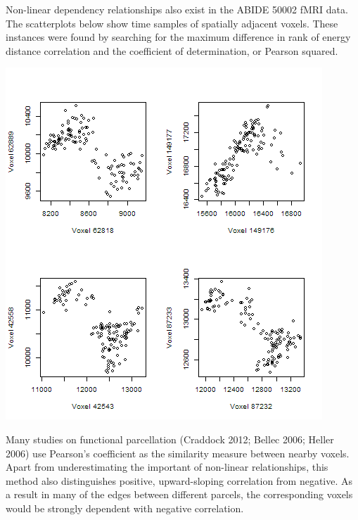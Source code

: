 Non-linear dependency relationships also exist in the ABIDE 50002 fMRI
data. The scatterplots below show time samples of spatially adjacent
voxels. These instances were found by searching for the maximum
difference in rank of energy distance correlation and the coefficient
of determination, or Pearson squared.

\includegraphics[scale = 0.7]{figs/1_nonlinear_ABIDE_50002.png}

Many studies on functional parcellation (Craddock 2012; Bellec 2006;
Heller 2006) use Pearson's coefficient as the similarity measure between
nearby voxels. Apart from underestimating the important of non-linear
relationships, this method also distinguishes positive, upward-sloping
correlation from negative. As a result in many of the edges between
different parcels, the corresponding voxels would be strongly dependent
with negative correlation.


